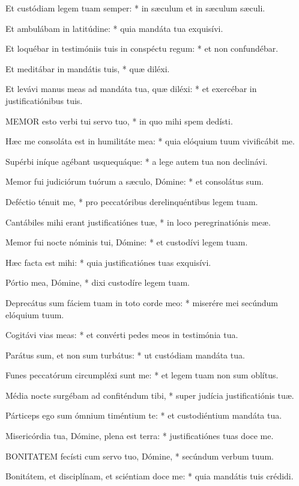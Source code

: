 Et custódiam legem tuam semper: * in sæculum et in sæculum sæculi.

Et ambulábam in latitúdine: * quia mandáta tua exquisívi.

Et loquébar in testimóniis tuis in conspéctu regum: * et non confundébar.

Et meditábar in mandátis tuis, * quæ diléxi.

Et levávi manus meas ad mandáta tua, quæ diléxi: * et exercébar in justificatiónibus tuis.


\lettrine[lines=2]{M}{EMOR} esto verbi tui servo tuo, * in quo mihi spem dedísti.

Hæc me consoláta est in humilitáte mea: * quia elóquium tuum vivificábit me.

Supérbi iníque agébant usquequáque: * a lege autem tua non declinávi.

Memor fui judiciórum tuórum a sæculo, Dómine: * et consolátus sum.

Deféctio ténuit me, * pro peccatóribus derelinquéntibus legem tuam.

Cantábiles mihi erant justificatiónes tuæ, * in loco peregrinatiónis meæ.

Memor fui nocte nóminis tui, Dómine: * et custodívi legem tuam.

Hæc facta est mihi: * quia justificatiónes tuas exquisívi.

Pórtio mea, Dómine, * dixi custodíre legem tuam.

Deprecátus sum fáciem tuam in toto corde meo: * miserére mei secúndum elóquium tuum.

Cogitávi vias meas: * et convérti pedes meos in testimónia tua.

Parátus sum, et non sum turbátus: * ut custódiam mandáta tua.

Funes peccatórum circumpléxi sunt me: * et legem tuam non sum oblítus.

Média nocte surgébam ad confiténdum tibi, * super judícia justificatiónis tuæ.

Párticeps ego sum ómnium timéntium te: * et custodiéntium mandáta tua.

Misericórdia tua, Dómine, plena est terra: * justificatiónes tuas doce me.


\lettrine[lines=2]{B}{ONITATEM} fecísti cum servo tuo, Dómine, * secúndum verbum tuum.

Bonitátem, et disciplínam, et sciéntiam doce me: * quia mandátis tuis crédidi.

